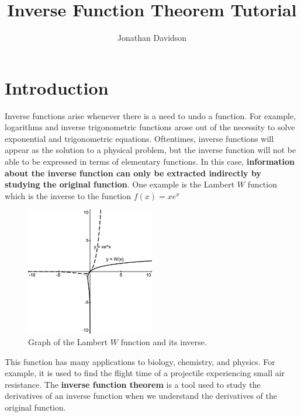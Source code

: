 \documentclass[12pt]{article}
\title{Inverse Function Theorem Tutorial}
\author{Jonathan Davidson}
\date{}
\numberwithin{equation}{section}
\begin{document}
\maketitle

\section{Introduction}
Inverse functions arise whenever there is a need to undo a function. For example, logarithms and inverse trigonometric functions arose out of the necessity to solve exponential and trigonometric equations. Oftentimes, inverse functions will appear as the solution to a physical problem, but the inverse function will not be able to be expressed in terms of elementary functions. In this case, \textbf{information about the inverse function can only be extracted indirectly by studying the original function}. One example is the Lambert $W$ function which is the inverse to the function $f(x) = xe^x$

\begin{figure}[h]
	\centering
	\includegraphics[width=0.5\textwidth]{fig1}
	\caption{Graph of the Lambert $W$ function and its inverse.}
\end{figure}
\pagebreak
\noindent This function has many applications to biology, chemistry, and physics. For example, it is used to find the flight time of a projectile experiencing small air resistance. The \textbf{inverse function theorem} is a tool used to study the derivatives of an inverse function when we understand the derivatives of the original function.
\end{document}
